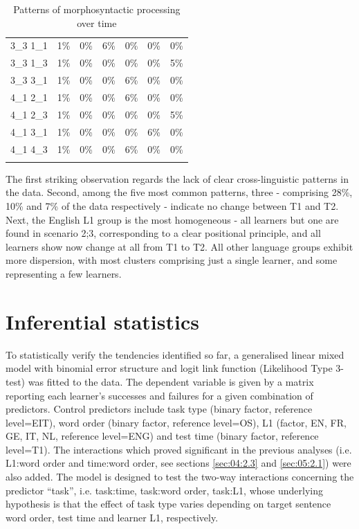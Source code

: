 \begin{table}
\begin{tabularx}{\textwidth}{XXXXXXX}
    3\_3 1\_1 & 1\% & 0\% & 6\% & 0\% & 0\% & 0\%\\
    3\_3 1\_3 & 1\% & 0\% & 0\% & 0\% & 0\% & 5\%\\
    3\_3 3\_1 & 1\% & 0\% & 0\% & 6\% & 0\% & 0\%\\
    4\_1 2\_1 & 1\% & 0\% & 0\% & 6\% & 0\% & 0\%\\
    4\_1 2\_3 & 1\% & 0\% & 0\% & 0\% & 0\% & 5\%\\
    4\_1 3\_1 & 1\% & 0\% & 0\% & 0\% & 6\% & 0\%\\
    4\_1 4\_3 & 1\% & 0\% & 0\% & 6\% & 0\% & 0\%\\
    \lspbottomrule
    \end{tabularx}
    \caption{Patterns of morphosyntactic processing over time}
    \label{tab:06:6}
\end{table}

The first striking observation regards the lack of clear cross-linguistic patterns in the data. Second, among the five most common patterns, three - comprising 28\%, 10\% and 7\% of the data respectively - indicate no change between T1 and T2. Next, the English L1 group is the most homogeneous - all learners but one are found in scenario 2;3, corresponding to a clear positional principle, and all learners show now change at all from T1 to T2. All other language groups exhibit more dispersion, with most clusters comprising just a single learner, and some representing a few learners. 

\section{Inferential statistics}\label{sec:06:4}

To statistically verify the tendencies identified so far, a generalised linear mixed model with binomial error structure and logit link function (Likelihood Type 3-test) was fitted to the data. The dependent variable is given by a matrix reporting each learner’s successes and failures for a given combination of predictors. Control predictors include task type (binary factor, reference level=EIT), word order (binary factor, reference level=OS), L1 (factor, EN, FR, GE, IT, NL, reference level=ENG) and test time (binary factor, reference level=T1). The interactions which proved significant in the previous analyses (i.e. L1:word order and time:word order, see sections \ref{sec:04:2.3} and \ref{sec:05:2.1}) were also added. The model is designed to test the two-way interactions concerning the predictor “task”, i.e. task:time, task:word order, task:L1, whose underlying hypothesis is that the effect of task type varies depending on target sentence word order, test time and learner L1, respectively. 

